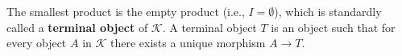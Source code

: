 The smallest product is the empty product (i.e., $I = \emptyset$), which is standardly called a \textbf{terminal object} of $\mathcal{K}$. A terminal object $T$ is an object such that for every object $A$ in $\mathcal{K}$ there exists a unique morphism $A \longrightarrow T$.
